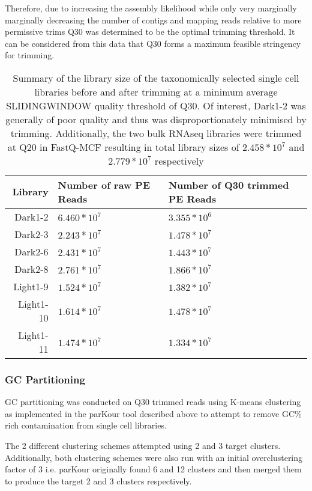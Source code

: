 Therefore, due to increasing the assembly likelihood while only very marginally
marginally decreasing the number of contigs and mapping reads relative to
more permissive trims Q30 was determined to be the optimal trimming threshold.
It can be considered from this data that Q30 forms a maximum feasible stringency for trimming. 

\begin{table}
    \begin{tabular}{|r||l|l|}
        \hline
        \textbf{Library} & \textbf{Number of raw PE Reads} & \textbf{Number of Q30 trimmed PE Reads} \\
        \hline
        Dark1-2 &  \(6.460*10^{7}\) &  \(3.355*10^{6}\)\\ 
        Dark2-3 & \(2.243*10^7\)&  \(1.478*10^7\)\\
        Dark2-6 & \(2.431*10^7\) & \(1.443*10^7\) \\
        Dark2-8 & \(2.761*10^7\) &  \(1.866*10^7\) \\
        Light1-9 & \(1.524*10^7\) & \(1.382*10^7\) \\
        Light1-10 & \(1.614*10^7\) & \(1.478*10^7\) \\
        Light1-11 & \(1.474*10^7\) & \(1.334*10^7\) \\
        \hline
    \end{tabular}
    \caption{Summary of the library size of the taxonomically selected single cell 
        libraries before and after trimming at a minimum average SLIDINGWINDOW quality 
        threshold of Q30. Of interest, Dark1-2 was generally of poor quality and thus 
        was disproportionately minimised by trimming. Additionally, the 
        two bulk RNAseq libraries were trimmed at Q20 in FastQ-MCF resulting in 
    total library sizes of \(2.458*10^{7}\) and \(2.779*10^{7}\) respectively}
\end{table}

\subsubsection{GC Partitioning} 

GC partitioning was conducted on Q30 trimmed reads 
using K-means clustering as implemented in the parKour tool described above 
to attempt to remove GC\% rich contamination from single cell libraries.

The 2 different clustering schemes attempted using 2 and 3 target clusters.
Additionally, both clustering schemes were also run with an initial overclustering factor of 3
i.e. parKour originally found 6 and 12 clusters and then merged them to produce the target 2 and 3 
clusters respectively. 

